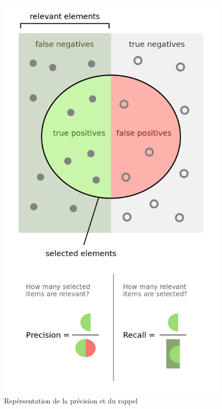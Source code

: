 \begin{figure}[htp]
	\begin{center}
		\includegraphics[scale=0.3]{figures/precisionrecall.png}
		\caption{Repérsentation de la précision et du rappel \cite{WIKI}}
		\label{fig:precisonrecall} %
	\end{center}
\end{figure}

